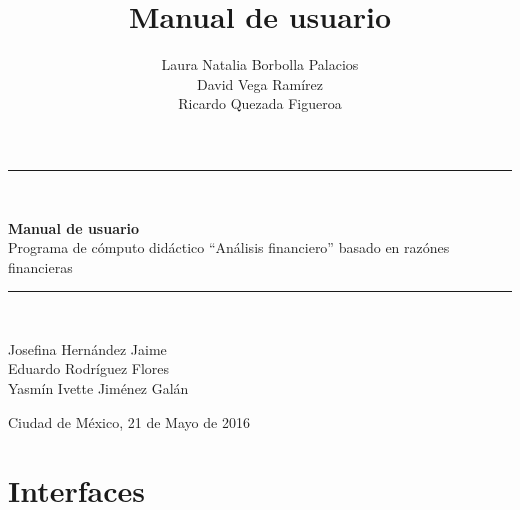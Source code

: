 \documentclass[oneside,12pt]{article}
\title{Manual de usuario}
\author{Laura Natalia Borbolla Palacios \\
        David Vega Ramírez \\
        Ricardo Quezada Figueroa}
\begin{document}
    \begin{titlepage}
		\begin{center}
			\vspace*{2.5in}
			\rule{170mm}{0.1mm}\\
			\vspace*{0.2in}
			\begin{Large}
				\textbf{Manual de usuario} \\                   %
                \vspace*{0.2in}
                Programa de cómputo didáctico ``Análisis financiero'' basado en razónes financieras\\
			\end{Large}
			\vspace*{0.2in}
			\rule{170mm}{0.1mm}\\
			\begin{large}
				\vspace*{0.8in}
				Josefina Hernández Jaime\\                      %
                \vspace*{0.2in}
				Eduardo Rodríguez Flores\\
				\vspace*{0.2in}
				Yasmín Ivette Jiménez Galán\\
			\end{large}
			\begin{large}
				\vspace*{0.8in}
				Ciudad de México, 21 de Mayo de 2016\\          %
			\end{large}
		\end{center}
	\end{titlepage}

    \tableofcontents
    \newpage

    \section{Interfaces}
    
    \newpage
    
    \newpage
    
    \newpage
    
    \newpage
    
    \newpage
    
    \newpage
    
    \newpage
    
\end{document}

